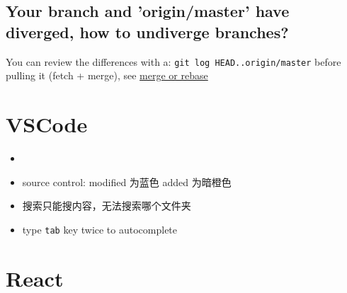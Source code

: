 \documentclass[a4paper, 12pt]{article}
\begin{document}
\subsection{Your branch and 'origin/master' have diverged, how to undiverge branches?}
You can review the differences with a: \verb|git log HEAD..origin/master| before pulling it (fetch + merge), see \href{https://stackoverflow.com/questions/2452226/master-branch-and-origin-master-have-diverged-how-to-undiverge-branches}{merge or rebase}



\section{VSCode}
\begin{itemize}

\item 

\item source control: modified 为蓝色 \quad added 为暗橙色

\item 搜索只能搜内容，无法搜索哪个文件夹

\item type \verb|tab| key twice to autocomplete
\end{itemize}


\section{React}
\end{document}
